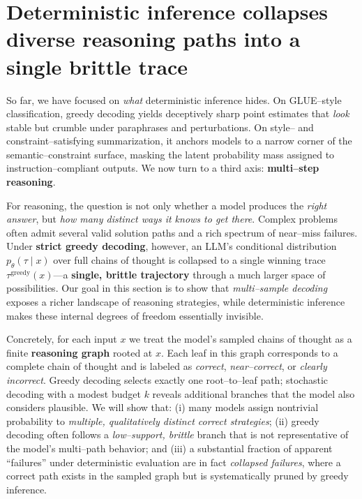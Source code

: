 

\section{Deterministic inference collapses diverse reasoning paths into a single brittle trace}
\label{sec:reasoning-collapse}

So far, we have focused on \emph{what} deterministic inference hides.
On GLUE--style classification, greedy decoding yields deceptively sharp
point estimates that \emph{look} stable but crumble under paraphrases
and perturbations.
On style-- and constraint--satisfying summarization, it anchors models
to a narrow corner of the semantic--constraint surface, masking the
latent probability mass assigned to instruction--compliant outputs.
We now turn to a third axis: \textbf{multi--step reasoning}.

For reasoning, the question is not only whether a model produces the
\emph{right answer}, but \emph{how many distinct ways it knows to get
there}.
Complex problems often admit several valid solution paths and a rich
spectrum of near--miss failures.
Under \textbf{strict greedy decoding}, however, an LLM's conditional
distribution $p_\theta(\tau \mid x)$ over full chains of thought is
collapsed to a single winning trace
$\tau^{\mathrm{greedy}}(x)$---a \textbf{single, brittle trajectory}
through a much larger space of possibilities.
Our goal in this section is to show that \emph{multi--sample decoding}
exposes a richer landscape of reasoning strategies, while deterministic
inference makes these internal degrees of freedom essentially invisible.

Concretely, for each input $x$ we treat the model's sampled chains of
thought as a finite \textbf{reasoning graph} rooted at $x$.
Each leaf in this graph corresponds to a complete chain of thought and
is labeled as \emph{correct}, \emph{near--correct}, or \emph{clearly
incorrect}.
Greedy decoding selects exactly one root--to--leaf path; stochastic
decoding with a modest budget $k$ reveals additional branches that the
model also considers plausible.
We will show that:
(i) many models assign nontrivial probability to
\emph{multiple, qualitatively distinct correct strategies};
(ii) greedy decoding often follows a \emph{low--support, brittle}
branch that is not representative of the model's multi--path behavior;
and (iii) a substantial fraction of apparent ``failures'' under
deterministic evaluation are in fact \emph{collapsed failures}, where a
correct path exists in the sampled graph but is systematically pruned by
greedy inference.

